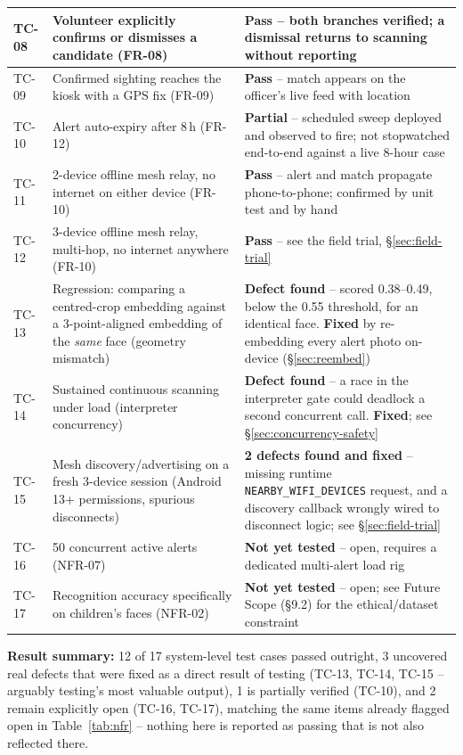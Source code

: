 \documentclass[12pt,a4paper,oneside]{report}
\newcommand{\code}[1]{\texttt{#1}}
\begin{document}
\begin{longtable}{|p{1.0cm}|p{5.9cm}|p{5.7cm}|}
TC-08 & Volunteer explicitly confirms or dismisses a candidate (FR-08) & \textbf{Pass} -- both branches verified; a dismissal returns to scanning without reporting \\ \hline
TC-09 & Confirmed sighting reaches the kiosk with a GPS fix (FR-09) & \textbf{Pass} -- match appears on the officer's live feed with location \\ \hline
TC-10 & Alert auto-expiry after 8\,h (FR-12) & \textbf{Partial} -- scheduled sweep deployed and observed to fire; not stopwatched end-to-end against a live 8-hour case \\ \hline
TC-11 & 2-device offline mesh relay, no internet on either device (FR-10) & \textbf{Pass} -- alert and match propagate phone-to-phone; confirmed by unit test and by hand \\ \hline
TC-12 & 3-device offline mesh relay, multi-hop, no internet anywhere (FR-10) & \textbf{Pass} -- see the field trial, \S\ref{sec:field-trial} \\ \hline
TC-13 & Regression: comparing a centred-crop embedding against a 3-point-aligned embedding of the \emph{same} face (geometry mismatch) & \textbf{Defect found} -- scored 0.38--0.49, below the 0.55 threshold, for an identical face. \textbf{Fixed} by re-embedding every alert photo on-device (\S\ref{sec:reembed}) \\ \hline
TC-14 & Sustained continuous scanning under load (interpreter concurrency) & \textbf{Defect found} -- a race in the interpreter gate could deadlock a second concurrent call. \textbf{Fixed}; see \S\ref{sec:concurrency-safety} \\ \hline
TC-15 & Mesh discovery/advertising on a fresh 3-device session (Android 13+ permissions, spurious disconnects) & \textbf{2 defects found and fixed} -- missing runtime \code{NEARBY\_WIFI\_DEVICES} request, and a discovery callback wrongly wired to disconnect logic; see \S\ref{sec:field-trial} \\ \hline
TC-16 & 50 concurrent active alerts (NFR-07) & \textbf{Not yet tested} -- open, requires a dedicated multi-alert load rig \\ \hline
TC-17 & Recognition accuracy specifically on children's faces (NFR-02) & \textbf{Not yet tested} -- open; see Future Scope (\S9.2) for the ethical/dataset constraint \\
\hline
\end{longtable}

\textbf{Result summary:} 12 of 17 system-level test cases passed outright,
3 uncovered real defects that were fixed as a direct result of testing
(TC-13, TC-14, TC-15 -- arguably testing's most valuable output), 1 is
partially verified (TC-10), and 2 remain explicitly open (TC-16, TC-17),
matching the same items already flagged open in Table~\ref{tab:nfr} --
nothing here is reported as passing that is not also reflected there.
\end{document}

